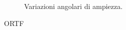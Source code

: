 \begin{figure}[t]
\begin{subfigure}[t]{0.99\textwidth}
        \caption{Variazioni angolari di ampiezza.}%
        \label{plot:ortf}
    \end{subfigure}
    \caption{ORTF}
    \label{sp:ortf}
\end{figure}
